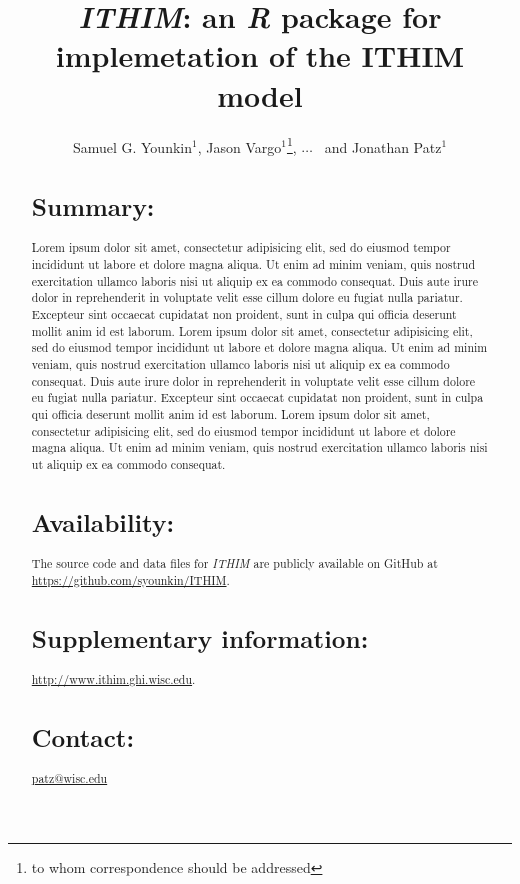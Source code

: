 \documentclass{bioinfo}
\newcommand{\package}{\emph{ITHIM}}
\newcommand{\R}{\emph{R}}
\begin{document}

\title[\package{}]{\package{}: an \R{} package for implemetation of
  the ITHIM model}
\author[Younkin \textit{et~al}]{Samuel G. Younkin$^{1}$,
  Jason Vargo$^{1}$\footnote{to whom correspondence should be addressed},
  $\ldots$
  \ and Jonathan Patz$^{1}$}
\address{$^{1}$Global Health Institute\\
University of Wisconsin{\textendash}Madison, Madison, WI USA\\
}


\maketitle

\begin{abstract}

\section{Summary:}

Lorem ipsum dolor sit amet, consectetur adipisicing elit, sed do
eiusmod tempor incididunt ut labore et dolore magna aliqua. Ut enim ad
minim veniam, quis nostrud exercitation ullamco laboris nisi ut
aliquip ex ea commodo consequat. Duis aute irure dolor in
reprehenderit in voluptate velit esse cillum dolore eu fugiat nulla
pariatur. Excepteur sint occaecat cupidatat non proident, sunt in
culpa qui officia deserunt mollit anim id est laborum. Lorem ipsum
dolor sit amet, consectetur adipisicing elit, sed do eiusmod tempor
incididunt ut labore et dolore magna aliqua. Ut enim ad minim veniam,
quis nostrud exercitation ullamco laboris nisi ut aliquip ex ea
commodo consequat. Duis aute irure dolor in reprehenderit in voluptate
velit esse cillum dolore eu fugiat nulla pariatur. Excepteur sint
occaecat cupidatat non proident, sunt in culpa qui officia deserunt
mollit anim id est laborum. Lorem ipsum dolor sit amet, consectetur
adipisicing elit, sed do eiusmod tempor incididunt ut labore et dolore
magna aliqua. Ut enim ad minim veniam, quis nostrud exercitation
ullamco laboris nisi ut aliquip ex ea commodo consequat.

\section{Availability:}
The source code and data files for \package{} are publicly available
on GitHub at \url{https://github.com/syounkin/ITHIM}.

\section{Supplementary information:}

\url{http://www.ithim.ghi.wisc.edu}.

\section{Contact:}
\href{patz@wisc.edu}{patz@wisc.edu}
\end{abstract}
\end{document}
